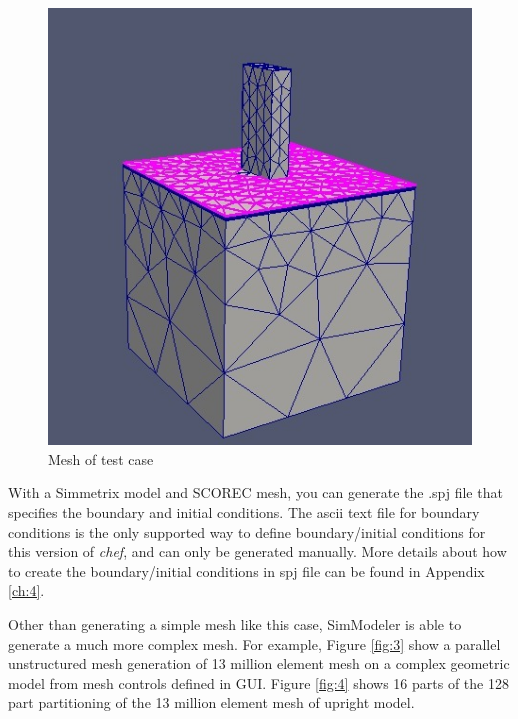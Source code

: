 \documentclass{article}
\begin{document}
\begin{figure}[h!] 
\centering
\includegraphics[width=1\textwidth]{fig2}
\caption{Mesh of test case}
\label{fig:2}
\end{figure}

With a Simmetrix model and SCOREC mesh, you can generate the .spj file that specifies the boundary and initial conditions. The ascii text file for boundary conditions is the only supported way to define boundary/initial conditions for this version of \textit{chef}, and can only be generated manually. More details about how to create the boundary/initial conditions in spj file can be found in Appendix \ref{ch:4}. 

Other than generating a simple mesh like this case, SimModeler is able to generate a much more complex mesh. For example, Figure \ref{fig:3} show a parallel unstructured mesh generation of 13 million element mesh on a complex geometric model from mesh controls defined in GUI. Figure \ref{fig:4} shows 16 parts of the 128 part partitioning of the 13 million element mesh of upright model.
\end{document}
